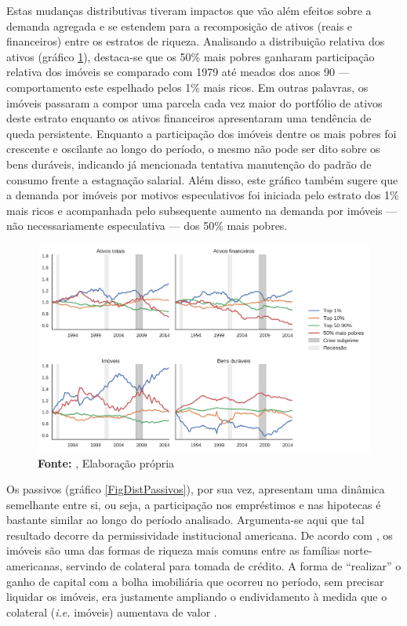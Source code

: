 Estas mudanças distributivas tiveram impactos que vão além efeitos sobre a demanda agregada e se estendem para a recomposição de ativos (reais e financeiros) entre os estratos de riqueza.
Analisando a distribuição relativa dos ativos (gráfico \ref{FigDistAtivos}), destaca-se que os 50\% mais pobres ganharam participação relativa dos imóveis se comparado com 1979 até meados dos anos 90 ---  comportamento este espelhado pelos 1\% mais ricos. 
Em outras palavras, os imóveis passaram a compor uma parcela cada vez maior do portfólio de ativos deste estrato enquanto os ativos financeiros apresentaram uma tendência de queda persistente.
Enquanto a participação dos imóveis dentre os mais pobres foi crescente e oscilante ao longo do período, o mesmo não pode ser dito sobre os bens duráveis, indicando já mencionada tentativa manutenção do padrão de consumo frente a estagnação salarial.
Além disso, este gráfico também sugere que a demanda por imóveis por motivos especulativos foi iniciada pelo estrato dos 1\% mais ricos e acompanhada pelo subsequente aumento na demanda por imóveis --- não necessariamente especulativa --- dos 50\% mais pobres.


\begin{figure}[H]
	\centering
	\caption{Distribuição de ativos por percentil de riqueza (1989/07=1)}
	\label{FigDistAtivos}
	\includegraphics[width=\textwidth]{../../Dados/Fatos_Estilizados/figs/Distribuicao_Ativos.png}
	\caption*{\textbf{Fonte:} \textcite{us_census_bureau_characteristics_2017}, Elaboração própria}
\end{figure}

Os passivos (gráfico \ref{FigDistPassivos}), por sua vez, apresentam uma dinâmica semelhante entre si, ou seja, a participação nos empréstimos e nas hipotecas  é bastante similar ao longo do período analisado.
Argumenta-se aqui que tal resultado decorre da permissividade institucional americana.
De acordo com \textcite{teixeira_uma_2011}, os imóveis são uma das formas de riqueza mais comuns entre as famílias norte-americanas, servindo de colateral para tomada de crédito. A forma de ``realizar'' o ganho de capital com a bolha imobiliária que ocorreu no período, sem precisar liquidar os imóveis, era justamente ampliando o endividamento à medida que o colateral (\textit{i.e.} imóveis) aumentava de valor \cite{teixeira_crescimento_2015}. 


